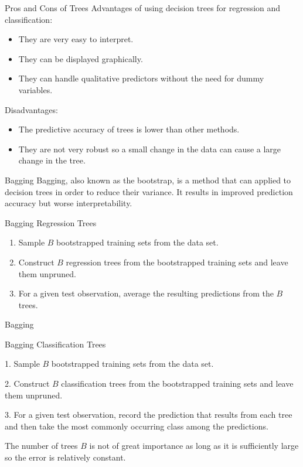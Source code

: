 \documentclass[
  ignorenonframetext,
  aspectratio=169,
]{beamer}
\begin{document}
\begin{frame}{Pros and Cons of Trees}
\protect\hypertarget{pros-and-cons-of-trees}{}
Advantages of using decision trees for regression and classification:

\begin{itemize}
\item
  They are very easy to interpret.
\item
  They can be displayed graphically.
\item
  They can handle qualitative predictors without the need for dummy
  variables.
\end{itemize}

Disadvantages:

\begin{itemize}
\item
  The predictive accuracy of trees is lower than other methods.
\item
  They are not very robust so a small change in the data can cause a
  large change in the tree.
\end{itemize}
\end{frame}

\begin{frame}{Bagging}
\protect\hypertarget{bagging}{}
Bagging, also known as the bootstrap, is a method that can applied to
decision trees in order to reduce their variance. It results in improved
prediction accuracy but worse interpretability.

\begin{block}{Bagging Regression Trees}
\protect\hypertarget{bagging-regression-trees}{}
\begin{enumerate}
\item
  Sample \(B\) bootstrapped training sets from the data set.
\item
  Construct \(B\) regression trees from the bootstrapped training sets
  and leave them unpruned.
\item
  For a given test observation, average the resulting predictions from
  the \(B\) trees.
\end{enumerate}
\end{block}
\end{frame}

\begin{frame}{Bagging}
\protect\hypertarget{bagging-1}{}
\begin{exampleblock}{Bagging Classification Trees}

1. Sample $B$ bootstrapped training sets from the data set.

2. Construct $B$ classification trees from the bootstrapped training sets and leave them unpruned.

3. For a given test observation, record the prediction that results from each tree and then take the most commonly occurring class among the predictions.

\end{exampleblock}

The number of trees \(B\) is not of great importance as long as it is
sufficiently large so the error is relatively constant.
\end{frame}
\end{document}
